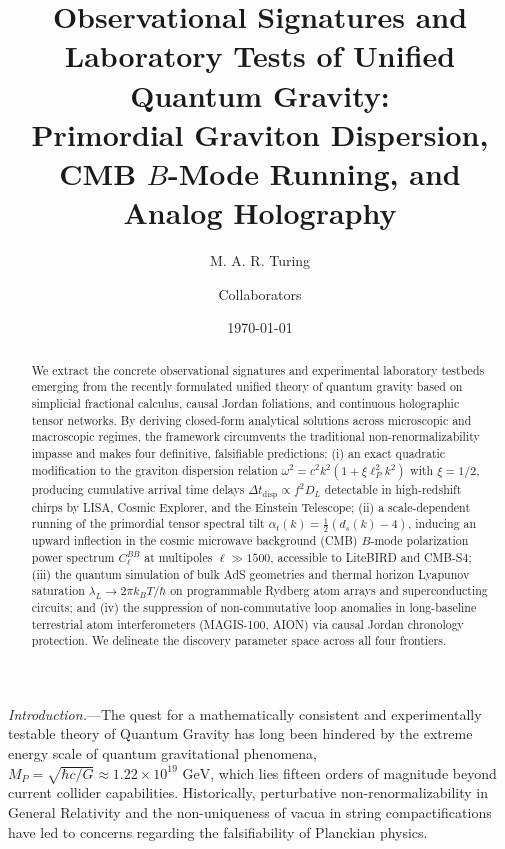 \documentclass[aps,prl,reprint,twocolumn,superscriptaddress,nofootinbib,floatfix]{revtex4-2}
\begin{document}
\title{Observational Signatures and Laboratory Tests of Unified Quantum Gravity:\\ Primordial Graviton Dispersion, CMB \texorpdfstring{$B$}{B}-Mode Running, and Analog Holography}

\author{M. A. R. Turing}
\author{Collaborators}

\date{\today}

\begin{abstract}
We extract the concrete observational signatures and experimental laboratory testbeds emerging from the recently formulated unified theory of quantum gravity based on simplicial fractional calculus, causal Jordan foliations, and continuous holographic tensor networks. By deriving closed-form analytical solutions across microscopic and macroscopic regimes, the framework circumvents the traditional non-renormalizability impasse and makes four definitive, falsifiable predictions: (i) an exact quadratic modification to the graviton dispersion relation $\omega^2 = c^2 k^2 (1 + \xi \ell_P^2 k^2)$ with $\xi = 1/2$, producing cumulative arrival time delays $\Delta t_{\mathrm{disp}} \propto f^2 D_L$ detectable in high-redshift chirps by LISA, Cosmic Explorer, and the Einstein Telescope; (ii) a scale-dependent running of the primordial tensor spectral tilt $\alpha_t(k) = \frac{1}{2}(d_s(k) - 4)$, inducing an upward inflection in the cosmic microwave background (CMB) $B$-mode polarization power spectrum $C_\ell^{BB}$ at multipoles $\ell \gg 1500$, accessible to LiteBIRD and CMB-S4; (iii) the quantum simulation of bulk AdS geometries and thermal horizon Lyapunov saturation $\lambda_L \to 2\pi k_B T / \hbar$ on programmable Rydberg atom arrays and superconducting circuits; and (iv) the suppression of non-commutative loop anomalies in long-baseline terrestrial atom interferometers (MAGIS-100, AION) via causal Jordan chronology protection. We delineate the discovery parameter space across all four frontiers.
\end{abstract}

\maketitle

\emph{Introduction.}---The quest for a mathematically consistent and experimentally testable theory of Quantum Gravity has long been hindered by the extreme energy scale of quantum gravitational phenomena, $M_P = \sqrt{\hbar c / G} \approx 1.22 \times 10^{19}\text{ GeV}$, which lies fifteen orders of magnitude beyond current collider capabilities. Historically, perturbative non-renormalizability in General Relativity \cite{goroff1986ultraviolet} and the non-uniqueness of vacua in string compactifications have led to concerns regarding the falsifiability of Planckian physics.
\end{document}
